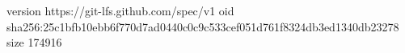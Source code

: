 version https://git-lfs.github.com/spec/v1
oid sha256:25c1bfb10ebb6f770d7ad0440c0c9c533cef051d761f8324db3ed1340db23278
size 174916
